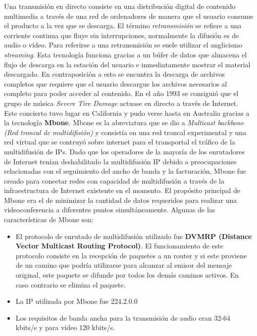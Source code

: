 Una transmisi\'on en directo consiste en una distribuci\'on digital de contenido multimedia a trav\'es de una red de ordenadores de manera que el usuario consume el producto a la vez que se descarga. El t\'ermino \textit{retransmisi\'on} se refiere a una corriente continua que fluye sin interrupciones, normalmente la difusi\'on es de audio o v\'ideo. Para referirse a una retransmisi\'on se suele utilizar el anglicismo \textit{streaming}. Esta tecnolog\'ia funciona gracias a un b\'ufer de datos que almacena el flujo de descarga en la estaci\'on del usuario e inmediatamente mostrar el material descargado. En contraposici\'on a esto se encuntra la descarga de archivos completos que requiere que el usuario descargue los archivos necesarios al completo para poder acceder al contenido. En el a\~no 1993 se consigui\'o que el grupo de m\'usica \textit{Severe Tire Damage} actuase en directo a trav\'es de Internet. Este concierto tuvo lugar en California y pudo verse hasta en Australia gracias a la tecnolog\'ia \textbf{Mbone}. Mbone es la abreviatura que se dio a \textit{Multicast backbone (Red troncal de multidifisi\'on)} y consist\'ia en una red troncal experimental y una red virtual que se contruy\'o sobre internet para el transportal el tr\'afico de la multidifusi\'on de IPs. Dado que los operadores de la mayor\'ia de los enrutadores de Internet ten\'ian deshabilitado la multidifusi\'on IP debido a preocupaciones relacionadas con el seguimiento del ancho de banda y la facturaci\'on, Mbone fue creado para conectar redes con capacidad de multidifusi\'on a trav\'es de la infraestructura de Internet existente en el momento. El prop\'osito principal de Mbone era el de minimizar la cantidad de datos requeridos para realizar una videoconferencia a diferentes puntos simult\'aneamente. Algunas de las caracter\'isticas de Mbone son:\par

\begin{itemize}
\item El protocolo de enrutado de multidifusi\'on utilizado fue \textbf{DVMRP (Distance Vector Multicast Routing Protocol)}. El funcionamiento de este protocolo consiste en la recepci\'on de paquetes a un router y si este proviene de un camino que podr\'ia utilizarse para alcanzar al emisor del mensaje original, este paquete se difunde por todos los dem\'as caminos activos. En caso contrario se elimina el paquete. 
\item La IP utilizada por Mbone fue 224.2.0.0 
\item Los requisitos de banda ancha para la transmisi\'on de audio eran 32-64 kbits/s y para video 120 kbits/s.
\end{itemize}

